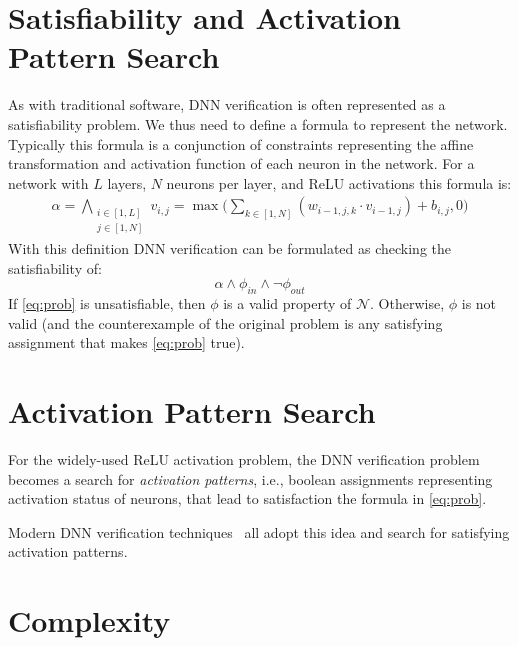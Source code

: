 

\section{Satisfiability and Activation Pattern Search}\label{sec:satisfiability-and-activation-pattern-search}

 As with traditional software, DNN verification is often represented as a satisfiability problem.
We thus need to define a formula to represent the network. Typically this formula is a conjunction of constraints representing the affine transformation and activation function of each neuron in the network.
For a network with $L$ layers, $N$ neurons per layer, and ReLU activations this formula is:
\begin{align*}
\alpha = \bigwedge_{\begin{smallmatrix}i \in [1,L]\\ j \in [1,N]\end{smallmatrix}} v_{i,j} = \max \Big( \sum_{k \in [1,N]} (w_{i-1,j,k} \cdot v_{i-1,j}) + b_{i,j}, 0 \Big)
\end{align*}
With this definition DNN verification can be formulated as checking the satisfiability of:
\begin{equation}\label{eq:prob}
  \alpha \land \phi_{in} \land \neg \phi_{out}
\end{equation}
If \autoref{eq:prob} is unsatisfiable, then $\phi$ is a valid property of $\mathcal{N}$. Otherwise, $\phi$ is not valid (and the counterexample of the original problem is any satisfying assignment that makes \autoref{eq:prob} true).


\section{Activation Pattern Search} For the widely-used ReLU activation problem, the DNN verification problem becomes a search for \emph{activation patterns}, i.e., boolean assignments representing activation status of neurons, that lead to satisfaction the formula in \autoref{eq:prob}. 

Modern DNN verification techniques~\cite{bunel2020branch,wang2021beta,ferrari2022complete,duong2024harnessing,duong2023dpllt,ovalbab,katz2019marabou,bak2021nnenum} all adopt this idea and search for satisfying activation patterns.


\section{Complexity}


